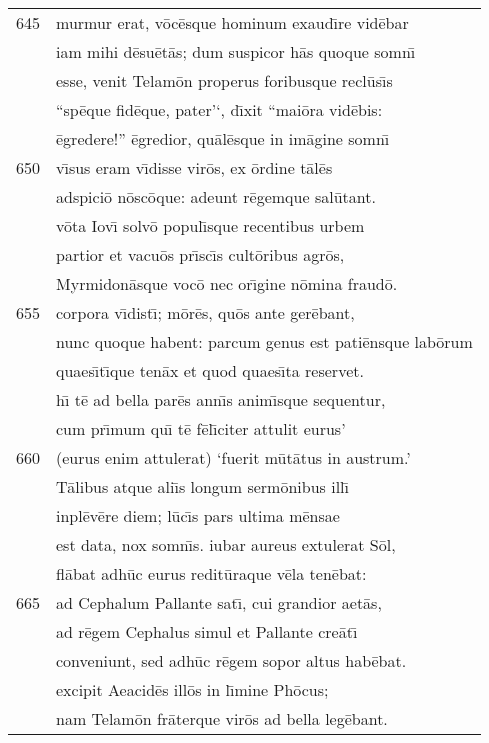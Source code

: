 \documentclass[paper=6in:9in,pagesize=pdftex,
               headinclude=on,footinclude=on,12pt]{scrbook}
\begin{document}
\begin{longtable}[p]{ r l }
645 & murmur erat, v\=oc\=esque hominum exaud\={\i}re vid\=ebar\\ 
 & iam mihi d\=esu\=et\=as; dum suspicor h\=as quoque somn\={\i}\\ 
 & esse, venit Telam\=on properus foribusque recl\=us\={\i}s\\ 
 & ``sp\=eque fid\=eque, pater'`, d\={\i}xit ``mai\=ora vid\=ebis:\\ 
 & \=egredere!'' \=egredior, qu\=al\=esque in im\=agine somn\={\i}\\ 
650 & v\={\i}sus eram v\={\i}disse vir\=os, ex \=ordine t\=al\=es\\ 
 & adspici\=o n\=osc\=oque: adeunt r\=egemque sal\=utant.\\ 
 & v\=ota Iov\={\i} solv\=o popul\={\i}sque recentibus urbem\\ 
 & partior et vacu\=os pr\={\i}sc\={\i}s cult\=oribus agr\=os,\\ 
 & Myrmidon\=asque voc\=o nec or\={\i}gine n\=omina fraud\=o.\\ 
655 & corpora v\={\i}dist\={\i}; m\=or\=es, qu\=os ante ger\=ebant,\\ 
 & nunc quoque habent: parcum genus est pati\=ensque lab\=orum\\ 
 & quaes\={\i}t\={\i}que ten\=ax et quod quaes\={\i}ta reservet.\\ 
 & h\={\i} t\=e ad bella par\=es ann\={\i}s anim\={\i}sque sequentur,\\ 
 & cum pr\={\i}mum qu\={\i} t\=e f\=el\={\i}citer attulit eurus'\\ 
660 & (eurus enim attulerat) `fuerit m\=ut\=atus in austrum.'\\ 
 & \indent T\=alibus atque ali\={\i}s longum serm\=onibus ill\={\i}\\ 
 & inpl\=ev\=ere diem; l\=uc\={\i}s pars ultima m\=ensae\\ 
 & est data, nox somn\={\i}s. iubar aureus extulerat S\=ol,\\ 
 & fl\=abat adh\=uc eurus redit\=uraque v\=ela ten\=ebat:\\ 
665 & ad Cephalum Pallante sat\={\i}, cui grandior aet\=as,\\ 
 & ad r\=egem Cephalus simul et Pallante cre\=at\={\i}\\ 
 & conveniunt, sed adh\=uc r\=egem sopor altus hab\=ebat.\\ 
 & excipit Aeacid\=es ill\=os in l\={\i}mine Ph\=ocus;\\ 
 & nam Telam\=on fr\=aterque vir\=os ad bella leg\=ebant.\\ 

\end{longtable}
\end{document}
